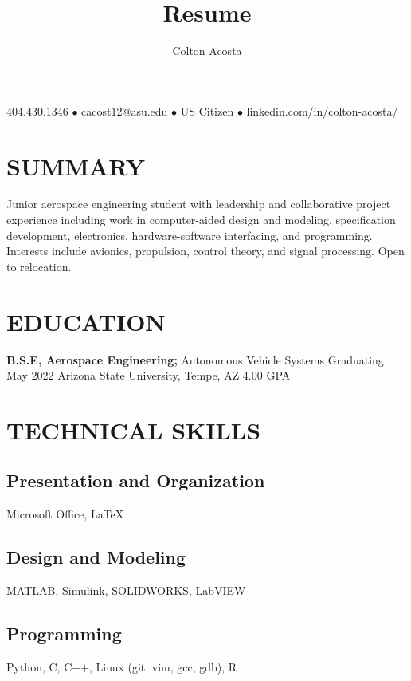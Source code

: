 \documentclass{article}
\makeatletter
\renewcommand{\maketitle}{
	\begin{center}
		{\huge\bfseries
			\theauthor}
			
		404.430.1346 $\bullet$ cacost12@asu.edu $\bullet$ US Citizen $\bullet$ linkedin.com/in/colton-acosta/
	\end{center}
}
\makeatother
\begin{document}
\title{Resume}
\author{Colton Acosta}
\maketitle
\section{SUMMARY}
Junior aerospace engineering student with leadership and collaborative project experience including work in computer-aided design and modeling, specification development, electronics, hardware-software interfacing, and programming. Interests include avionics, propulsion,  control theory, and signal processing. Open to relocation.
\section{EDUCATION}
\textbf{B.S.E, Aerospace Engineering;} Autonomous Vehicle Systems
\hfill 
Graduating May 2022
\linebreak
Arizona State University, Tempe, AZ 
\hfill
4.00 GPA

\section{TECHNICAL SKILLS}
\subsection{Presentation and Organization}
Microsoft Office,  {\LaTeX}
\subsection{Design and Modeling}
MATLAB, Simulink, SOLIDWORKS, LabVIEW
\subsection{Programming} 
Python, C, C++, Linux (git, vim, gcc, gdb), R
\end{document}
